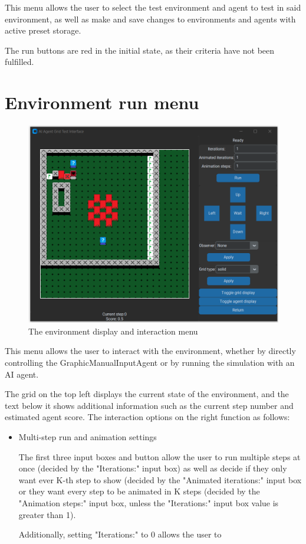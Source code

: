 \documentclass[masterthesis]{fer}
\begin{document}
This menu allows the user to select the test environment and agent to test in said environment, as well as make and save changes to environments and agents with active preset storage.

The run buttons are red in the initial state, as their criteria have not been fulfilled.

\section{Environment run menu}
\begin{figure}[htb]
  \centering
  \includegraphics[width=0.5\linewidth]{Figures/thesis run.png} 
  \caption{The environment display and interaction menu}
  \label{slk:thesis_run}
\end{figure}

This menu allows the user to interact with the environment, whether by directly controlling the GraphicManualInputAgent or by running the simulation with an AI agent.

The grid on the top left displays the current state of the environment,
and the text below it shows additional information such as the current step number and estimated agent score.
The interaction options on the right function as follows:
\begin{itemize}
\item{Multi-step run and animation settings}

The first three input boxes and button allow the user to run multiple steps at once (decided by the "Iterations:" input box) as well as decide if they only want ever K-th step to show (decided by the "Animated iterations:" input box or they want every step to be animated in K steps (decided by the "Animation steps:" input box, unless the "Iterations:" input box value is greater than 1).

Additionally, setting "Iterations:" to 0 allows the user to 
\end{itemize}
\end{document}
